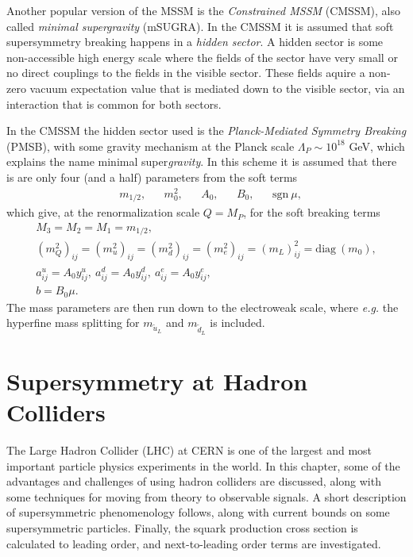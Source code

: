 \documentclass[twoside,english]{uiofysmaster}
\begin{document}
{Another popular version of the MSSM is the \textit{Constrained MSSM} (CMSSM), also called \textit{minimal supergravity} (mSUGRA). In the CMSSM it is assumed that soft supersymmetry breaking happens in a \textit{hidden sector}. A hidden sector is some non-accessible high energy scale where the fields of the sector have very small or no direct couplings to the fields in the visible sector. These fields aquire a non-zero vacuum expectation value that is mediated down to the visible sector, via an interaction that is common for both sectors. 

In the CMSSM the hidden sector used is the \textit{Planck-Mediated Symmetry Breaking} (PMSB), with some gravity mechanism at the Planck scale $\Lambda_P \sim 10^{18}$ GeV, which explains the name minimal super\textit{gravity}. In this scheme it is assumed that there is are only four (and a half) parameters from the soft terms
\begin{align}
&m_{1/2}, &&m_0^2, &&A_0, &&B_0, &&\mathrm{sgn}~ \mu,
\end{align}
which give, at the renormalization scale $Q=M_P$, for the soft breaking terms
\begin{align}
M_3 = M_2 = M_1 = m_{1/2},\\
(m_Q^2)_{ij} = (m_u^2)_{ij} = (m_d^2)_{ij} = (m_e^2)_{ij} = (m_L)^2_{ij} = \mathrm{diag}~ (m_0),\\
a^u_{ij} = A_0 y_{ij}^u, ~a^d_{ij} = A_0 y_{ij}^d,~a^e_{ij} = A_0 y^e_{ij},\\
b = B_0 \mu.
\end{align}
The mass parameters are then run down to the electroweak scale, where \textit{e.g.} the hyperfine mass splitting for $m_{\tilde{u}_L}$ and $m_{\tilde{d}_L}$ is included.





\chapter{Supersymmetry at Hadron Colliders}

The Large Hadron Collider (LHC) at CERN is one of the largest and most important particle physics experiments in the world. In this chapter, some of the advantages and challenges of using hadron colliders are discussed, along with some techniques for moving from theory to observable signals. A short description of supersymmetric phenomenology follows, along with current bounds on some supersymmetric particles. Finally, the squark production cross section is calculated to leading order, and next-to-leading order terms are investigated.

}
\end{document}
